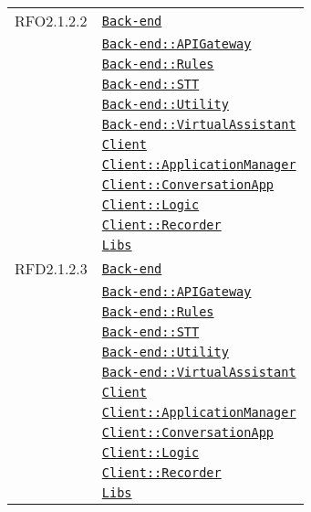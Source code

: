 \begin{longtable}{|>{\centering}m{3cm}|m{10cm}<{\centering}|}
RFO2.1.2.2 & \hyperref[Back-end]{\texttt{Back-end}}\\
& \hyperref[Back-end::APIGateway]{\texttt{Back-end::APIGateway}}\\
& \hyperref[Back-end::Rules]{\texttt{Back-end::Rules}}\\
& \hyperref[Back-end::STT]{\texttt{Back-end::STT}}\\
& \hyperref[Back-end::Utility]{\texttt{Back-end::Utility}}\\
& \hyperref[Back-end::VirtualAssistant]{\texttt{Back-end::VirtualAssistant}}\\
& \hyperref[Client]{\texttt{Client}}\\
& \hyperref[Client::ApplicationManager]{\texttt{Client::ApplicationManager}}\\
& \hyperref[Client::ConversationApp]{\texttt{Client::ConversationApp}}\\
& \hyperref[Client::Logic]{\texttt{Client::Logic}}\\
& \hyperref[Client::Recorder]{\texttt{Client::Recorder}}\\
& \hyperref[Libs]{\texttt{Libs}}\\ \hline

RFD2.1.2.3 & \hyperref[Back-end]{\texttt{Back-end}}\\
& \hyperref[Back-end::APIGateway]{\texttt{Back-end::APIGateway}}\\
& \hyperref[Back-end::Rules]{\texttt{Back-end::Rules}}\\
& \hyperref[Back-end::STT]{\texttt{Back-end::STT}}\\
& \hyperref[Back-end::Utility]{\texttt{Back-end::Utility}}\\
& \hyperref[Back-end::VirtualAssistant]{\texttt{Back-end::VirtualAssistant}}\\
& \hyperref[Client]{\texttt{Client}}\\
& \hyperref[Client::ApplicationManager]{\texttt{Client::ApplicationManager}}\\
& \hyperref[Client::ConversationApp]{\texttt{Client::ConversationApp}}\\
& \hyperref[Client::Logic]{\texttt{Client::Logic}}\\
& \hyperref[Client::Recorder]{\texttt{Client::Recorder}}\\
& \hyperref[Libs]{\texttt{Libs}}\\ \hline


\end{longtable}
